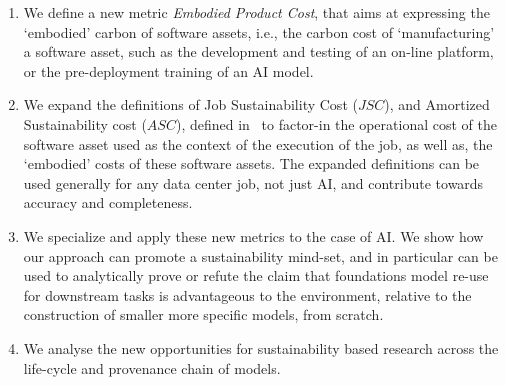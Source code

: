\begin{enumerate}
    \item We define a new metric {\em Embodied Product Cost}, that aims at expressing the `embodied' carbon of software assets,  i.e., the carbon cost of `manufacturing' a software asset, such as the development and testing of an on-line platform, or the pre-deployment training of an AI model. 
    \item We expand the definitions of Job Sustainability Cost ($JSC$), and 
    Amortized Sustainability cost ($ASC$), defined in~\cite{gandhi2022metrics} to factor-in the operational cost of the software asset used as the
    context of the execution of the job, as well as, the `embodied' costs of these software assets. The expanded 
    definitions can be used generally for any data center job, not just AI, and contribute towards accuracy and completeness.  
    \item We specialize and apply these new metrics to the case of AI. We show how our approach can promote a sustainability mind-set, and in particular can be used to analytically prove or refute the claim that foundations model re-use for downstream tasks is advantageous to the environment, relative to the construction of smaller more specific models, from scratch.
    \item We analyse the new opportunities for sustainability based research across the life-cycle and provenance chain of models.
\end{enumerate}

